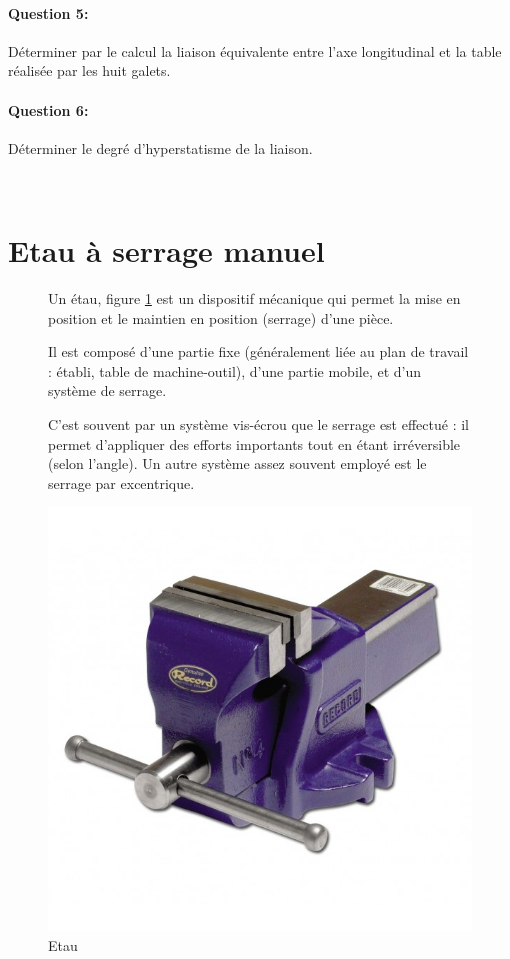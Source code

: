 \paragraph{Question 5:}

Déterminer par le calcul la liaison équivalente entre l'axe longitudinal et la table réalisée par les huit galets.

\paragraph{Question 6:}

Déterminer le degré d'hyperstatisme de la liaison.  

\newpage

~\

\cleardoublepage

\section{Etau à serrage manuel}

\begin{figure}[htbp]
\begin{minipage}[c]{.6\linewidth}
Un étau, figure \ref{fig:image4} est un dispositif mécanique qui permet la \og mise en position \fg et le \og maintien en position \fg (serrage) d'une pièce.

Il est composé d'une partie fixe (généralement liée au plan de travail : établi, table de machine-outil), d'une partie mobile, et d'un système de serrage.

C'est souvent par un système vis-écrou que le serrage est effectué : il permet d'appliquer des efforts importants tout en étant irréversible (selon l'angle). Un autre système assez souvent employé est le serrage par excentrique.
\end{minipage}
\hfill
\begin{minipage}[c]{.35\linewidth}
\begin{center}
\includegraphics[width=0.8\linewidth]{img/etau.jpg}
\caption{Etau}
\label{fig:image4}
\end{center}
\end{minipage}
\end{figure}

